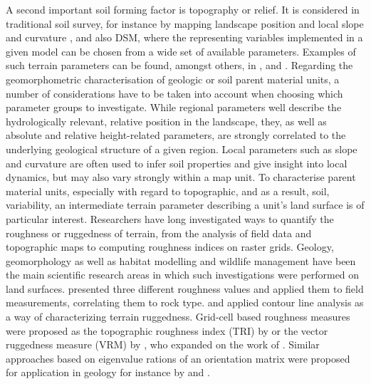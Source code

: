 \documentclass[preprint,12pt,authoryear]{elsarticle}
\begin{document}
A second important soil forming factor is topography or relief. It is considered in traditional soil survey, for instance by mapping landscape position and local slope and curvature \citep{FAO2006}, and also DSM, where the representing variables implemented in a given model can be chosen from a wide set of available parameters. Examples of such terrain parameters can be found, amongst others, in \cite{Boehner2009},\cite{Gallant2000} and \cite{Olaya2009141}. Regarding the geomorphometric characterisation of geologic or soil parent material units, a number of considerations have to be taken into account when choosing which parameter groups to investigate. While regional parameters well describe the hydrologically relevant, relative position in the landscape, they, as well as absolute and relative height-related parameters, are strongly correlated to the underlying geological structure of a given region. Local parameters such as slope and curvature are often used to infer soil properties and give insight into local dynamics, but may also vary strongly within a map unit. To characterise parent material units, especially with regard to topographic, and as a result, soil, variability, an intermediate terrain parameter describing a unit's land surface is of particular interest. Researchers have long investigated ways to quantify the roughness or ruggedness of terrain, from the analysis of field data and topographic maps to computing roughness indices on raster grids. Geology, geomorphology as well as habitat modelling and wildlife management have been the main scientific research areas in which such investigations were performed on land surfaces.  \cite{Hobson1972} presented three different roughness values and applied them to field measurements, correlating them to rock type. \cite{Beasom1983} and \cite{Nellemann1994} applied contour line analysis as a way of characterizing terrain ruggedness. Grid-cell based roughness measures were proposed as the topographic roughness index (TRI) by  \cite{Riley1999} or the vector ruggedness measure (VRM) by \cite{Sappington2007}, who expanded on the work of \cite{Hobson1972}. Similar approaches based on eigenvalue rations of an orientation matrix were proposed for application in geology for instance by \cite{Woodcock1977} and \cite{Coblentz2014}.
\end{document}
